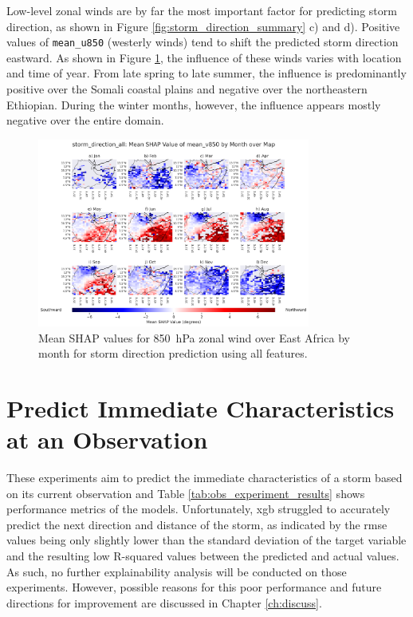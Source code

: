 Low-level zonal winds are by far the most important factor for predicting storm direction, as shown in Figure \ref{fig:storm_direction_summary} c) and d). Positive values of \texttt{mean\_u850} (westerly winds) tend to shift the predicted storm direction eastward. As shown in Figure \ref{fig:storm_direction_all_shap_mean_v850_map_by_month}, the influence of these winds varies with location and time of year. From late spring to late summer, the influence is predominantly positive over the Somali coastal plains and negative over the northeastern Ethiopian. During the winter months, however, the influence appears mostly negative over the entire domain.

\begin{figure}[ht]
    \centering
    \includegraphics[width=0.8\textwidth]{../figures/generated/experiments/storm_direction/geographic_corr/storm_direction_all_shap_mean_v850_map_by_month.png}
    \caption{Mean SHAP values for \SI{850}{\hecto\pascal} zonal wind over East Africa by month for storm direction prediction using all features.}
    \label{fig:storm_direction_all_shap_mean_v850_map_by_month}
\end{figure}

\clearpage
\section{Predict Immediate Characteristics at an Observation}

These experiments aim to predict the immediate characteristics of a storm based on its current observation and Table \ref{tab:obs_experiment_results} shows performance metrics of the models. Unfortunately, \acrshort{xgb} struggled to accurately predict the next direction and distance of the storm, as indicated by the \acrshort{rmse} values being only slightly lower than the standard deviation of the target variable and the resulting low R-squared values between the predicted and actual values. As such, no further explainability analysis will be conducted on those experiments. However, possible reasons for this poor performance and future directions for improvement are discussed in Chapter \ref{ch:discuss}.

